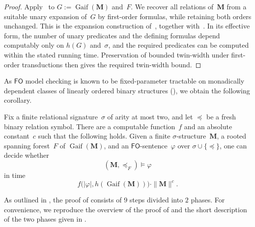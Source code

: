 \documentclass[1p,number,11pt]{elsarticle}
\newcommand{\Gaif}{\operatorname{Gaif}}
\theoremstyle{plain}
\renewcommand{\FO}{\ensuremath{\mathsf{FO}}}
\begin{document}
\begin{proof}
Apply~ to $G:=\Gaif(\mathbf M)$ and~$F$.
We recover all relations of~$\mathbf M$ from a suitable unary expansion of~$G$ by first-order formulas,
while retaining both orders unchanged. This is the expansion
construction of~, together
with~. In its effective form, the number of
unary predicates and the defining formulas depend computably
only on $h(G)$ and~$\sigma$, and the required predicates can
be computed within the stated running time. Preservation of
bounded twin-width under first-order transductions then gives
the required twin-width bound.
\end{proof}

As $\FO$ model checking is known to be fixed-parameter tractable on monadically dependent classes of linearly ordered binary structures (), we obtain the following corollary.

\begin{corollary}[store=cor-model-checking,restate-keys={note=see \zcpageref[nocap]{cor-model-checking}}]
Fix a finite relational signature~$\sigma$ of arity at most two,
and let $\preceq$ be a fresh binary relation symbol.
There are a computable function~$f$ and an absolute
constant~$c$ such that the following holds.
Given a finite $\sigma$-structure~$\mathbf M$, a rooted spanning
forest~$F$ of $\Gaif(\mathbf M)$, and an $\FO$-sentence~$\varphi$
over $\sigma\cup\{\preceq\}$, one can decide whether
\[
   (\mathbf M,\preceq_F)\models\varphi
\]
in time
\[
   f\bigl(|\varphi|,h(\Gaif(\mathbf M))\bigr)
   \cdot\|\mathbf M\|^c.
\]
\end{corollary}


As outlined in , the proof 
of 
consists of $9$ steps divided into $2$ phases.
For convenience, we reproduce the overview of the proof of  and the short description of the two phases given in .
\end{document}
